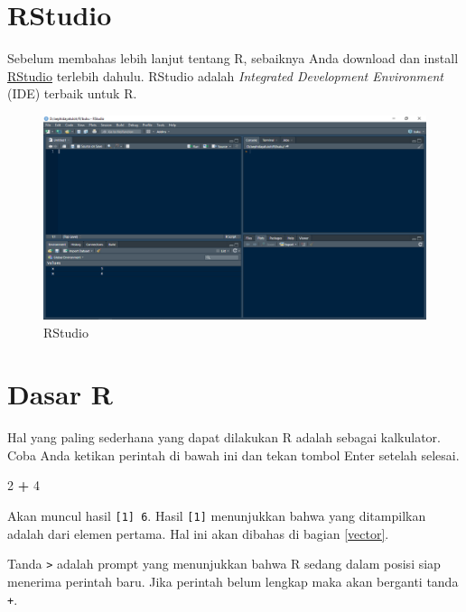 \documentclass[]{book}
\newenvironment{Shaded}{\begin{snugshade}}{\end{snugshade}}
\newcommand{\DecValTok}[1]{\textcolor[rgb]{0.00,0.00,0.81}{#1}}
\newcommand{\OperatorTok}[1]{\textcolor[rgb]{0.81,0.36,0.00}{\textbf{#1}}}
\newcommand{\StringTok}[1]{\textcolor[rgb]{0.31,0.60,0.02}{#1}}
\begin{document}
\hypertarget{rstudio}{%
\section{RStudio}\label{rstudio}}

Sebelum membahas lebih lanjut tentang R, sebaiknya Anda download dan install \href{https://www.rstudio.com/products/rstudio/download/}{RStudio} terlebih dahulu. RStudio adalah \emph{Integrated Development Environment} (IDE) terbaik untuk R.

\begin{figure}

{\centering \includegraphics[width=18.97in]{rstudio2} 

}

\caption{RStudio}\label{fig:unnamed-chunk-5}
\end{figure}

\hypertarget{dasar-r}{%
\section{Dasar R}\label{dasar-r}}

Hal yang paling sederhana yang dapat dilakukan R adalah sebagai kalkulator. Coba Anda ketikan perintah di bawah ini dan tekan tombol Enter setelah selesai.

\begin{Shaded}
\begin{Highlighting}[]
\DecValTok{2} \OperatorTok{+}\StringTok{ }\DecValTok{4}
\end{Highlighting}
\end{Shaded}

Akan muncul hasil \texttt{{[}1{]}\ 6}. Hasil \texttt{{[}1{]}} menunjukkan bahwa yang ditampilkan adalah dari elemen pertama. Hal ini akan dibahas di bagian \ref{vector}.

Tanda \texttt{\textgreater{}} adalah prompt yang menunjukkan bahwa R sedang dalam posisi siap menerima perintah baru. Jika perintah belum lengkap maka akan berganti tanda \texttt{+}.
\end{document}
